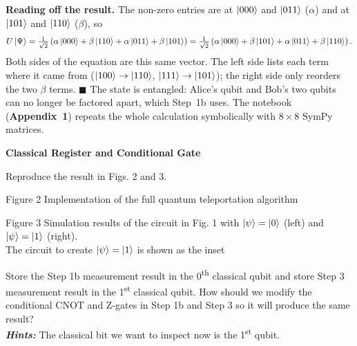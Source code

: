 \documentclass[a4paper, 10pt]{article}
\begin{document}
\begin{solution}
	\noindent \textbf{Reading off the result.} The non-zero entries are at \( \ket{000} \) and \( \ket{011} \) (\( \alpha \)) and at \( \ket{101} \) and \( \ket{110} \) (\( \beta \)), so
	\[
		U\ket{\Psi}
		= \tfrac{1}{\sqrt{2}}\left(\alpha\ket{000} + \beta\ket{110} + \alpha\ket{011} + \beta\ket{101}\right)
		= \tfrac{1}{\sqrt{2}}\left(\alpha\ket{000} + \beta\ket{101} + \alpha\ket{011} + \beta\ket{110}\right).
	\]
	Both sides of the equation are this same vector. The left side lists each term where it came from (\( \ket{100} \to \ket{110} \), \( \ket{111} \to \ket{101} \)); the right side only reorders the two \( \beta \) terms. \( \blacksquare \)
	The state is entangled: Alice's qubit and Bob's two qubits can no longer be factored apart, which Step~1b uses.
	The notebook (\textbf{Appendix~1}) repeats the whole calculation symbolically with \( 8 \times 8 \) SymPy matrices.
\end{solution}

\begin{problem}
\textbf{Classical Register and Conditional Gate}
\begin{subproblems_alpha}
	\item Reproduce the result in Figs. 2 and 3.

	      \begin{center}
		      {\footnotesize Figure 2 Implementation of the full quantum teleportation algorithm}
	      \end{center}


	      \begin{center}
		      {
			      \footnotesize Figure 3 Simulation results of the circuit in Fig. 1 with \( \ket{\psi} = \ket{0} \) (left) and \( \ket{\psi} = \ket{1} \) (right). \\
			      The circuit to create \( \ket{\psi} = \ket{1} \) is shown as the inset
		      }
	      \end{center}
	\item Store the Step 1b measurement result in the 0\textsuperscript{th} classical qubit
	      and store Step 3 measurement result in the 1\textsuperscript{st} classical qubit.
	      How should we modify the conditional CNOT and Z-gates in Step 1b and Step 3 so it will produce the same result? \\
	      \textbf{\textit{Hints:}} The classical bit we want to inspect now is the 1\textsuperscript{st} qubit.
\end{subproblems_alpha}
\end{problem}
\end{document}
